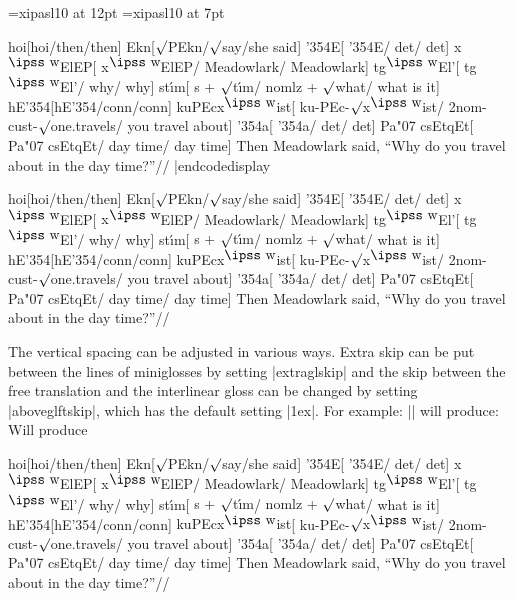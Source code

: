 
\font\ips=xipasl10 at 12pt
\font\ipss=xipasl10 at 7pt
\def\mroot{$\surd$}
\def\L{\char'354}
\def\v#1{{\accent"07 #1}}
\def\C{{\accent"07 c}}
\def\W{$^{\hbox{\ipss w}}\mskip-2mu$}

\codedisplay
{}

\ex
\begingl
hoi[hoi/then/then]
Ekn[{\mroot}PEkn/{\mroot}say/{she said}]
{\L}E[ {\L}E/ det/ det]
{x\W}ElEP[ {x\W}ElEP/ Meadowlark/ Meadowlark]
t{g\W}El'[ t{g\W}El'/ why/ why]
st{\'\i}m[ {s + \mroot t\'\i m}/ {nomlz + \mroot what}/ {what is it}]
{hE\L}[{hE\L}/conn/conn]
{kuPEcx\W ist}[ ku-PEc-\mroot{x\W}ist/ 2nom-cust-{\mroot}one.travels/ {you travel about}]
{\L a}[ {\L}a/ det/ det]
Pa{\v c}sEtqEt[ Pa{\v c}sEtqEt/ day time/ day time]
\endilg
\glft Then Meadowlark said, ``Why do you travel about in the day
   time?''//
\endgl
\xe
|endcodedisplay


\ex
\begingl
hoi[hoi/then/then]
Ekn[{\mroot}PEkn/{\mroot}say/{she said}]
{\L}E[ {\L}E/ det/ det]
{x\W}ElEP[ {x\W}ElEP/ Meadowlark/ Meadowlark]
t{g\W}El'[ t{g\W}El'/ why/ why]
st{\'\i}m[ {s + \mroot t\'\i m}/ {nomlz + \mroot what}/ {what is it}]
{hE\L}[{hE\L}/conn/conn]
{kuPEcx\W ist}[ ku-PEc-\mroot{x\W}ist/ 2nom-cust-{\mroot}one.travels/ {you travel about}]
{\L a}[ {\L}a/ det/ det]
Pa{\v c}sEtqEt[ Pa{\v c}sEtqEt/ day time/ day time]
\endilg
\glft Then Meadowlark said, ``Why do you travel about in the day
   time?''//
\endgl
\xe

The vertical spacing can be adjusted in various ways.  Extra skip can
be put between the lines of miniglosses by setting |extraglskip| and
the skip between the free translation and the interlinear
gloss can be changed by setting |aboveglftskip|, which has the default
setting |1ex|.  For example:
\medskip
\noindent |\ex[extraglskip=2ex,aboveglftskip=2ex]| will produce:
\medskip
Will produce

\ex[extraglskip=2ex,aboveglftskip=2ex]
\begingl
hoi[hoi/then/then]
Ekn[{\mroot}PEkn/{\mroot}say/{she said}]
{\L}E[ {\L}E/ det/ det]
{x\W}ElEP[ {x\W}ElEP/ Meadowlark/ Meadowlark]
t{g\W}El'[ t{g\W}El'/ why/ why]
st{\'\i}m[ {s + \mroot t\'\i m}/ {nomlz + \mroot what}/ {what is it}]
{hE\L}[{hE\L}/conn/conn]
{kuPEcx\W ist}[ ku-PEc-\mroot{x\W}ist/ 2nom-cust-{\mroot}one.travels/ {you travel about}]
{\L a}[ {\L}a/ det/ det]
Pa{\v c}sEtqEt[ Pa{\v c}sEtqEt/ day time/ day time]
\endilg
\glft Then Meadowlark said, ``Why do you travel about in the day
   time?''//
\endgl
\xe


